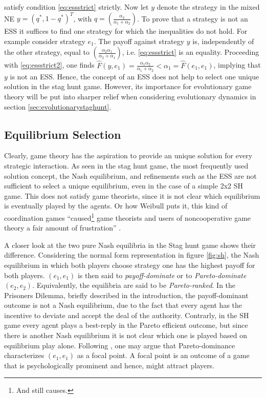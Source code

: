 satisfy condition \eqref{eq:essstrict} strictly. 
Now let $y$ denote the strategy in the mixed NE $y=(q^*,1-q^*)^T$, 
with $q=\left(\frac{\alpha_2}{\alpha_1+\alpha_2}\right)$.
To prove that a strategy is not an ESS it suffices to find one
strategy for which the inequalities do not hold.
For example consider strategy $e_1$.
The payoff against strategy $y$ is, independently of the other strategy, 
equal to $\left(\frac{\alpha_2 \alpha_1}{\alpha_2+\alpha_1}\right)$, i.e. 
\eqref{eq:essstrict} is an equality.
Proceeding with \eqref{eq:essstrict2}, one finds
$\hat{F}(y,e_1) = \frac{\alpha_1 \alpha_2}{\alpha_1+\alpha_2}
< \alpha_1 = \hat{F}(e_1,e_1)$, implying that $y$ is not an ESS.
Hence, the concept of an ESS does not help to select one 
unique solution in the stag hunt game. However, its importance for
evolutionary game theory will be put into sharper relief when considering
evolutionary dynamics in section \ref{sec:evolutionarystaghunt}. 


\subsection{Equilibrium Selection}
\label{sec:equilibriumselection}
Clearly, game theory has the aspiration to provide an unique solution for 
every strategic interaction.
As seen in the stag hunt game, the most frequently used solution concept, 
the Nash equilibrium, and refinements such as the ESS are
not sufficient to select a unique equilibrium, even in the case of a simple
2x2 SH game. This does not satisfy game theorists, since it is not clear which
equilibrium is eventually played by the agents. Or how 
Weibull puts it, this kind of coordination games 
``caused\footnote{And still causes.} game theorists and users of 
noncooperative game theory a fair amount of frustration'' 
\parencite[30]{weibull_evolutionary_1997}. 

A closer look at the two pure Nash equilibria in the Stag hunt game 
shows their difference. Considering the normal form representation in figure 
\ref{fig:sh}, the Nash equilibrium in which both players choose strategy one 
has the highest payoff
for both players. $(e_1,e_1)$ is then said to 
\textit{payoff-dominate} or to \textit{Pareto-dominate} 
$(e_2,e_2)$. Equivalently, the equilibria are said to be
\textit{Pareto-ranked}.
In the Prisoners Dilemma, briefly described in the introduction, 
the payoff-dominant outcome is not a 
Nash equilibrium, due to the fact that every agent has the incentive to 
deviate and accept the deal of the authority.
Contrarly, in the SH game every agent plays a best-reply 
in the Pareto efficient outcome, but since there is another Nash equilibrium 
it is not clear which one is played based on equilibrium play alone. 
Following \textcite[57]{schelling_strategy_1960}, one may argue that 
Pareto-dominance characterizes $(e_1,e_1)$ as a focal point. 
A focal point is an outcome of a game that is psychologically prominent and
hence, might attract players.

